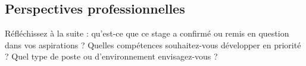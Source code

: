 \subsection{Perspectives professionnelles}

\begin{guideline}
Réfléchissez à la suite : qu'est-ce que ce stage a confirmé ou remis
en question dans vos aspirations ? Quelles compétences souhaitez-vous
développer en priorité ? Quel type de poste ou d'environnement
envisagez-vous ?
\end{guideline}

